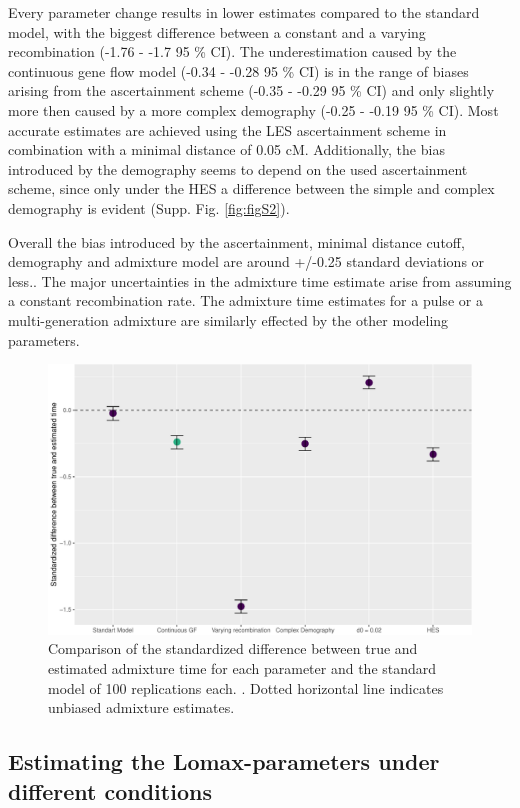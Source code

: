 \documentclass[]{article}
\begin{document}
Every parameter change results in lower estimates compared to the
standard model, with the biggest difference between a constant and a
varying recombination (-1.76 - -1.7 95 \% CI). The
underestimation caused by the continuous gene flow model (-0.34 -
-0.28 95 \% CI) is in the range of biases arising from the ascertainment scheme (-0.35 -
-0.29 95 \% CI) and only slightly more then caused by a more complex demography (-0.25 -
-0.19 95 \% CI). Most accurate estimates are achieved using the LES
ascertainment scheme in combination with a minimal distance of 0.05 cM.
Additionally, the bias introduced by the demography seems to depend on
the used ascertainment scheme, since only under the HES a difference
between the simple and complex demography is evident (Supp. Fig.
\ref{fig:figS2}).

Overall the bias introduced by the ascertainment, minimal distance
cutoff, demography and admixture model are  around +/-0.25 standard deviations or less.. The major uncertainties in the admixture time
estimate arise from assuming a constant recombination rate. The
admixture time estimates for a pulse or a multi-generation admixture are similarly effected by the other modeling parameters.

\begin{figure}
\centering
\includegraphics{Admixture_Time_Inference_Paper_Draft_files/figure-latex/fig3-1.pdf}
\caption{\label{fig:fig3} Comparison of the standardized difference between true and estimated admixture time for each parameter and the standard model of 100 replications each. . Dotted horizontal line indicates unbiased admixture estimates.}
\end{figure}

\subsection{Estimating the Lomax-parameters under different conditions}\label{estimating the Lomax-parameters under different conditions}
\end{document}
